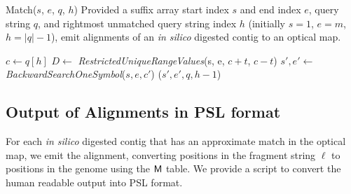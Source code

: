 \begin{algorithm}[t]
\caption{{\sc Match}($s$, $e$, $q$, $h$) Provided a suffix array start index $s$ and end index $e$, query string $q$, and rightmost unmatched query string index $h$ (initially $s=1$, $e=m$, $h=|q| - 1$), emit alignments of an \emph{in silico} digested contig to an optical map.}
\label{match}
\begin{algorithmic}

  \State {}
\Else
  \State {}
  \State $c \leftarrow q[h]$ 
  \State {}
  \State $D \leftarrow$ \emph{RestrictedUniqueRangeValues}(s, e, $c + t$, $c - t$) 
  \State {}
    \State {}
    \State {}
    \State $s', e' \leftarrow$ \emph{BackwardSearchOneSymbol}($s,e,c'$) 
      \State {}
      ($s', e', q, h - 1$) 
    \EndIf
  \EndFor
\EndIf
\EndProcedure
\end{algorithmic}
\end{algorithm}


   
\subsection{Output of Alignments in PSL format}
For each {\em in silico} digested contig that has an approximate match in the optical map, we emit the alignment, converting positions in the fragment string $\ell$ to positions in the genome using the $\mbox{\rm {\sf M}}$ table. We provide a script to convert the human readable output into PSL format. %
